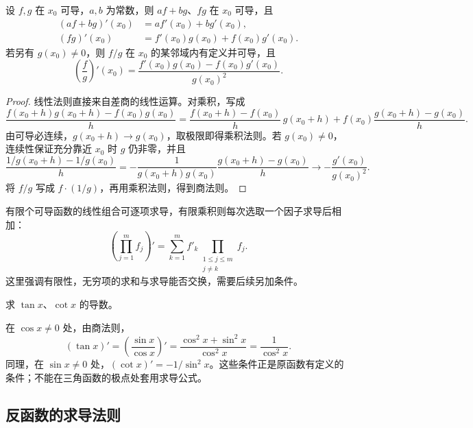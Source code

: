 \begin{theorem}
\label{thm:arithmetic-differentiation-rules}
设 $f,g$ 在 $x_0$ 可导，$a,b$ 为常数，则 $af+bg$、$fg$ 在 $x_0$ 可导，且
\begin{align}
    (af+bg)'(x_0)&=af'(x_0)+bg'(x_0),\label{eq:derivative-linearity}\\
    (fg)'(x_0)&=f'(x_0)g(x_0)+f(x_0)g'(x_0).\label{eq:derivative-product-rule}
\end{align}
若另有 $g(x_0)\ne0$，则 $f/g$ 在 $x_0$ 的某邻域内有定义并可导，且
\begin{equation}
\label{eq:derivative-quotient-rule}
    \left(\frac fg\right)'(x_0)
    =\frac{f'(x_0)g(x_0)-f(x_0)g'(x_0)}{g(x_0)^2}.
\end{equation}
\end{theorem}
\begin{proof}
线性法则直接来自差商的线性运算。对乘积，写成
\[
    \frac{f(x_0+h)g(x_0+h)-f(x_0)g(x_0)}h
    =\frac{f(x_0+h)-f(x_0)}h\,g(x_0+h)
    +f(x_0)\frac{g(x_0+h)-g(x_0)}h.
\]
由可导必连续，$g(x_0+h)\to g(x_0)$，取极限即得乘积法则。若 $g(x_0)\ne0$，连续性保证充分靠近 $x_0$ 时 $g$ 仍非零，并且
\[
    \frac{1/g(x_0+h)-1/g(x_0)}h
    =-\frac1{g(x_0+h)g(x_0)}
    \frac{g(x_0+h)-g(x_0)}h
    \longrightarrow-\frac{g'(x_0)}{g(x_0)^2}.
\]
将 $f/g$ 写成 $f\cdot(1/g)$，再用乘积法则，得到商法则。
\end{proof}

有限个可导函数的线性组合可逐项求导，有限乘积则每次选取一个因子求导后相加：
\[
    \left(\prod_{j=1}^m f_j\right)'
    =\sum_{k=1}^m f'_k\prod_{\substack{1\leq j\leq m\\j\ne k}}f_j.
\]
这里强调有限性，无穷项的求和与求导能否交换，需要后续另加条件。

\begin{example}
\label{ex:derivatives-of-tangent-and-cotangent}
求 $\tan x$、$\cot x$ 的导数。
\end{example}
\begin{solve}
在 $\cos x\ne0$ 处，由商法则，
\[
    (\tan x)'=\left(\frac{\sin x}{\cos x}\right)'
    =\frac{\cos^2x+\sin^2x}{\cos^2x}=\frac1{\cos^2x}.
\]
同理，在 $\sin x\ne0$ 处，$(\cot x)'=-1/\sin^2x$。这些条件正是原函数有定义的条件；不能在三角函数的极点处套用求导公式。
\end{solve}

\subsection{反函数的求导法则}
\label{subsec:inverse-function-rule}

